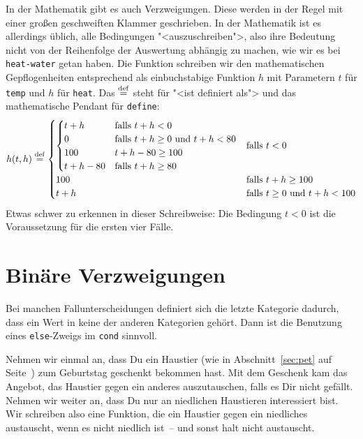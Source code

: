 In der Mathematik gibt es auch Verzweigungen.  Diese werden in der
Regel mit einer großen geschweiften Klammer geschrieben.  In der
Mathematik ist es allerdings üblich, alle Bedingungen
"<auszuschreiben">, also ihre Bedeutung nicht von der Reihenfolge der
Auswertung abhängig zu machen, wie wir es bei \lstinline{heat-water}
getan haben.  Die Funktion schreiben wir den mathematischen
Gepflogenheiten entsprechend als einbuchstabige Funktion $h$ mit
Parametern $t$ für \lstinline{temp} und $h$ für \lstinline{heat}.  Das
$\stackrel{\rm def}{=}$ steht für "<ist definiert als"> und das
mathematische Pendant für \lstinline{define}:
%
\begin{displaymath}
  h(t, h) \stackrel{\rm def}{=}
  \begin{cases}
    \begin{cases}
      t + h & \text{falls } t + h < 0\\
      0 & \text{falls } t + h \geq 0 \text{ und } t + h < 80 \\
      100 & t + h - 80 \geq 100\\
      t + h - 80 & \text{falls }  t +h \geq
      80
    \end{cases}
    & \text{falls } t < 0
    \\
    100 & \text{falls } t + h \geq 100
    \\
    t + h & \text{falls } t \geq 0 \text{ und } t + h < 100
  \end{cases}
\end{displaymath}
%
Etwas schwer zu erkennen in dieser Schreibweise: Die Bedingung $t < 0$
ist die Voraussetzung für die ersten vier Fälle.

\section{Binäre Verzweigungen}
\label{sec:binaere-verzweigungen}

Bei manchen Fallunterscheidungen definiert sich die letzte Kategorie
dadurch, dass ein Wert in keine der anderen Kategorien gehört.  Dann
ist die Benutzung eines \lstinline{else}-Zweigs im \lstinline{cond}
sinnvoll.

Nehmen wir einmal an, dass Du ein Haustier (wie in
Abschnitt~\ref{sec:pet} auf Seite~\pageref{sec:pet}) zum Geburtstag
geschenkt bekommen hast. Mit dem Geschenk kam das Angebot, das
Haustier gegen ein anderes auszutauschen, falls es Dir nicht gefällt.
Nehmen wir weiter an, dass Du nur an niedlichen Haustieren
interessiert bist.  Wir schreiben also eine Funktion, die ein Haustier
gegen ein niedliches austauscht, wenn es nicht niedlich ist~-- und
sonst halt nicht austauscht.

